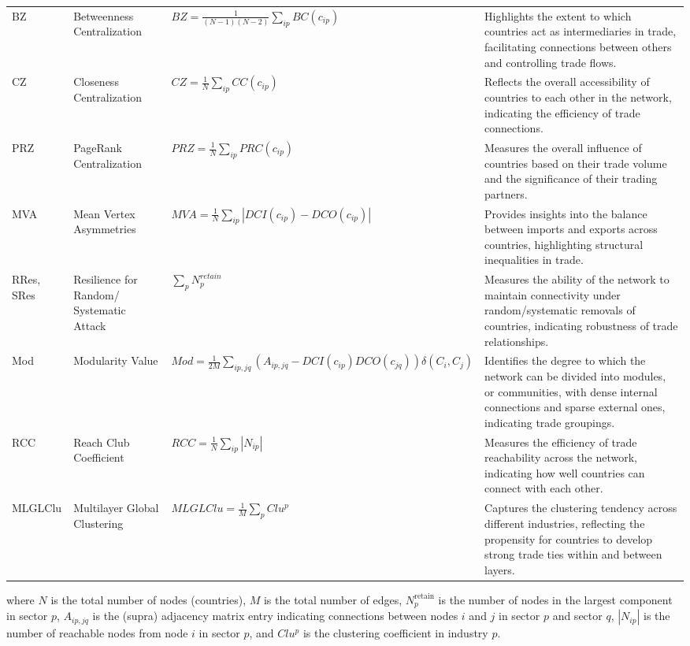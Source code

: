 \documentclass[preprint, 3p,
authoryear]{elsarticle} %
\begin{document}
\begin{table}[H]
{\begin{tabular}{lp{2cm}lp{7cm}}
        BZ  & Betweenness Centralization & $BZ = \frac{1}{(N-1)(N-2)} \sum_{ip} BC(c_{ip})$ & Highlights the extent to which countries act as intermediaries in trade, facilitating connections between others and controlling trade flows. \\ 
        CZ  & Closeness Centralization & $CZ = \frac{1}{N} \sum_{ip} CC(c_{ip})$ & Reflects the overall accessibility of countries to each other in the network, indicating the efficiency of trade connections. \\ 
        PRZ & PageRank Centralization & $PRZ = \frac{1}{N} \sum_{ip} PRC(c_{ip})$ & Measures the overall influence of countries based on their trade volume and the significance of their trading partners. \\ 
        MVA & Mean Vertex Asymmetries & $MVA = \frac{1}{N} \sum_{ip} |DCI(c_{ip}) - DCO(c_{ip})|$ & Provides insights into the balance between imports and exports across countries, highlighting structural inequalities in trade. \\ 
        RRes, SRes & Resilience for Random/ Systematic Attack & $\sum_pN_{p}^{retain}$ & Measures the ability of the network to maintain connectivity under random/systematic removals of countries, indicating robustness of trade relationships. \\ 
        Mod & Modularity Value & $Mod = \frac{1}{2M} \sum_{ip,jq} (A_{ip,jq} - DCI(c_{ip}) DCO(c_{jq})) \delta(C_i, C_j)$ & Identifies the degree to which the network can be divided into modules, or communities, with dense internal connections and sparse external ones, indicating trade groupings. \\ 
        RCC & Reach Club Coefficient & $RCC = \frac{1}{N} \sum_{ip} |N_{ip}|$ & Measures the efficiency of trade reachability across the network, indicating how well countries can connect with each other. \\ 
        MLGLClu & Multilayer Global Clustering & $MLGLClu = \frac{1}{M} \sum_{p} Clu^{p}$ & Captures the clustering tendency across different industries, reflecting the propensity for countries to develop strong trade ties within and between layers. \\ \bottomrule
    \end{tabular}}
\end{table}

\noindent  where \(N\) is the total number of nodes (countries), \(M\)
is the total number of edges, \(N_{p}^{\text{retain}}\) is the number of
nodes in the largest component in sector \(p\), \(A_{ip,jq}\) is the
(supra) adjacency matrix entry indicating connections between nodes
\(i\) and \(j\) in sector \(p\) and sector \(q\), \(|N_{ip}|\) is the
number of reachable nodes from node \(i\) in sector \(p\), and
\(Clu^{p}\) is the clustering coefficient in industry \(p\).
\end{document}
